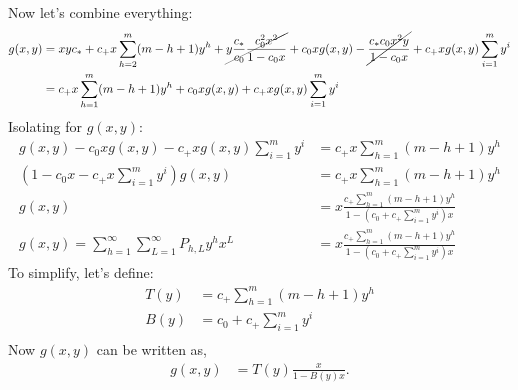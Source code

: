 	Now let's combine everything:
	\begin{align}
		g(x, y) &= xyc_* + c_+x \sum_{h=2}^m (m - h + 1)y^h + \cancel{y\frac{c_*}{c_0}\frac{c_0^2x^2}{1-c_0x}} + c_0xg(x, y) - \cancel{\frac{c_* c_0x^2y}{1-c_0x}} +  c_+ x g(x, y)\sum_{i=1}^m y^i\\
		&= c_+x \sum_{h=1}^m (m - h + 1)y^h + c_0xg(x, y) + c_+ x g(x, y)\sum_{i=1}^m y^i
	\end{align}
	Isolating for $g(x, y)$:
	\begin{align}
		g(x, y) - c_0xg(x, y) - c_+ x g(x, y)\sum_{i=1}^m y^i &= c_+x \sum_{h=1}^m (m - h + 1)y^h\\
		\left(1 - c_0x - c_+ x\sum_{i=1}^m y^i\right)g(x, y) &= c_+x \sum_{h=1}^m (m - h + 1)y^h\\
		g(x, y) &= x\frac{ c_+ \sum_{h=1}^m (m - h + 1)y^h}{1 - \left(c_0 + c_+ \sum_{i=1}^m y^i\right)x}\\
		g(x, y) = \sum_{h=1}^\infty\sum_{L=1}^\infty P_{h, L} y^h x^L &= x\frac{c_+ \sum_{h=1}^m (m - h + 1)y^h}{1 - \left(c_0 + c_+ \sum_{i=1}^m y^i\right)x}
	\end{align}
	To simplify, let's define:
	\begin{align}
		T(y) &= c_+ \sum_{h=1}^m (m - h + 1)y^h\\
		B(y) &= c_0 + c_+ \sum_{i=1}^m y^i\\
	\end{align}
	Now $g(x, y)$ can be written as,
	\begin{align}
		g(x, y) &= T(y)\frac{x}{1- B(y)x}.
	\end{align}
	\newpage
